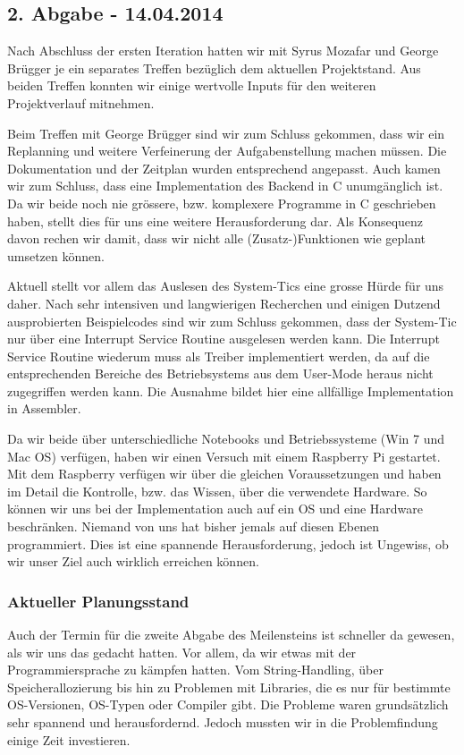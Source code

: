 \subsection{2. Abgabe - 14.04.2014}
Nach Abschluss der ersten Iteration hatten wir mit Syrus Mozafar und George Brügger je ein separates Treffen bezüglich dem aktuellen Projektstand. Aus beiden Treffen konnten wir einige wertvolle Inputs für den weiteren Projektverlauf mitnehmen. 

Beim Treffen mit George Brügger sind wir zum Schluss gekommen, dass wir ein Replanning und weitere Verfeinerung der Aufgabenstellung machen müssen. Die Dokumentation und der Zeitplan wurden entsprechend angepasst. Auch kamen wir zum Schluss, dass eine Implementation des Backend in C unumgänglich ist. Da wir beide noch nie grössere, bzw. komplexere Programme in C geschrieben haben, stellt dies für uns eine weitere Herausforderung dar. Als Konsequenz davon rechen wir damit, dass wir nicht alle (Zusatz-)Funktionen wie geplant umsetzen können.

Aktuell stellt vor allem das Auslesen des System-Tics eine grosse Hürde für uns daher. Nach sehr intensiven und langwierigen Recherchen und einigen Dutzend ausprobierten Beispielcodes sind wir zum Schluss gekommen, dass der System-Tic nur über eine Interrupt Service Routine ausgelesen werden kann. Die Interrupt Service Routine wiederum muss als Treiber implementiert werden, da auf die entsprechenden Bereiche des Betriebsystems aus dem User-Mode heraus nicht zugegriffen werden kann. Die Ausnahme bildet hier eine allfällige Implementation in Assembler. 

Da wir beide über unterschiedliche Notebooks und Betriebssysteme (Win 7 und Mac OS) verfügen, haben wir einen Versuch mit einem Raspberry Pi gestartet. Mit dem Raspberry verfügen wir über die gleichen Voraussetzungen und haben im Detail die Kontrolle, bzw. das Wissen, über die verwendete Hardware. So können wir uns bei der Implementation auch auf ein OS und eine Hardware beschränken. Niemand von uns hat bisher jemals auf diesen Ebenen programmiert. Dies ist eine spannende Herausforderung, jedoch ist Ungewiss, ob wir unser Ziel auch wirklich erreichen können. 

\subsubsection{Aktueller Planungsstand}
Auch der Termin für die zweite Abgabe des Meilensteins ist schneller da gewesen, als wir uns das gedacht hatten. Vor allem, da wir etwas mit der Programmiersprache zu kämpfen hatten. Vom String-Handling, über Speicherallozierung bis hin zu Problemen mit Libraries, die es nur für bestimmte OS-Versionen, OS-Typen oder Compiler gibt. Die Probleme waren grundsätzlich sehr spannend und herausfordernd. Jedoch mussten wir in die Problemfindung einige Zeit investieren. 